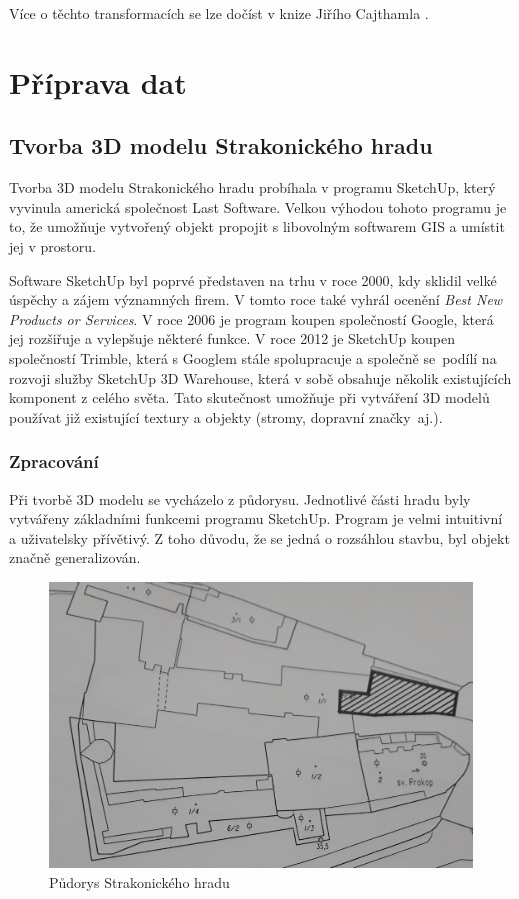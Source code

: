 \documentclass[thesis=M,czech]{FITthesis}[2012/06/26]
\begin{document}
Více o těchto transformacích se lze dočíst v knize Jiřího Cajthamla \cite{transformace}. 






\chapter{Příprava dat}




\section{Tvorba 3D modelu Strakonického hradu}
Tvorba 3D modelu Strakonického hradu probíhala v programu SketchUp, který vyvinula americká společnost Last Software. Velkou výhodou tohoto programu je to, že umožňuje vytvořený objekt propojit s libovolným softwarem GIS a umístit jej v prostoru. 

Software SketchUp byl poprvé představen na trhu v roce 2000, kdy sklidil velké úspěchy a zájem významných firem. V tomto roce také vyhrál ocenění \textit{Best New Products or Services}. V roce 2006 je program koupen společností Google, která jej rozšiřuje a vylepšuje některé funkce. V roce 2012 je SketchUp koupen společností Trimble, která s Googlem stále spolupracuje a společně se~podílí na rozvoji služby SketchUp 3D Warehouse, která v sobě obsahuje několik existujících komponent z celého světa. Tato skutečnost umožňuje při vytváření 3D modelů používat již existující textury a objekty (stromy, dopravní značky~aj.). \cite{sketchup1} \cite{sketchup2}

\subsection{Zpracování}
Při tvorbě 3D modelu se vycházelo z půdorysu. Jednotlivé části hradu byly vytvářeny základními funkcemi programu SketchUp. Program je velmi intuitivní a uživatelsky přívětivý. Z toho důvodu, že se jedná o rozsáhlou stavbu, byl objekt značně generalizován. 

\begin{figure}[h]
	\centering
	\includegraphics[width=13cm]{pics/pudorys_hrad.jpg}
	\caption{Půdorys Strakonického hradu}
	\label{obrazek:pudorys}
\end{figure}
\end{document}

